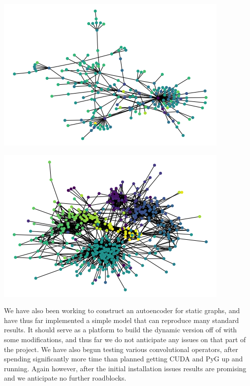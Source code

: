 \documentclass[10pt]{article}
\begin{document}
\begin{center}
\begin{minipage}{0.49\linewidth}
\includegraphics[width=\linewidth]{images/final1558607182.png}
\end{minipage}
\hfill
\begin{minipage}{0.49\linewidth}
\includegraphics[width=\linewidth]{images/final1558607425}
\end{minipage}
\end{center}

We have also been working to construct an autoencoder for static graphs, and have thus far implemented a simple model that can reproduce many standard results. It should serve as a platform to build the dynamic version off of with some modifications, and thus far we do not anticipate any issues on that part of the project. We have also begun testing various convolutional operators, after spending significantly more time than planned getting CUDA and PyG up and running. Again however, after the initial installation issues results are promising and we anticipate no further roadblocks. \\
\end{document}
